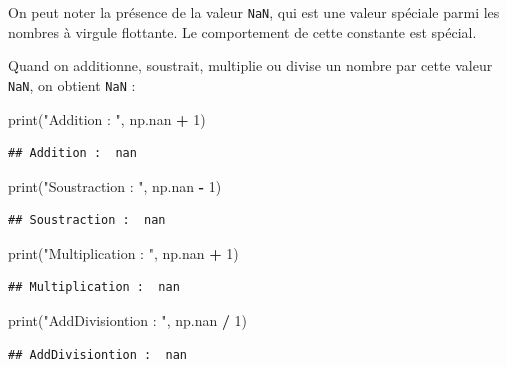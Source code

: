 \documentclass[12pt,]{book}
\newenvironment{Shaded}{\begin{snugshade}}{\end{snugshade}}
\newcommand{\DecValTok}[1]{\textcolor[rgb]{0.00,0.00,0.81}{#1}}
\newcommand{\StringTok}[1]{\textcolor[rgb]{0.31,0.60,0.02}{#1}}
\newcommand{\OperatorTok}[1]{\textcolor[rgb]{0.81,0.36,0.00}{\textbf{#1}}}
\newcommand{\BuiltInTok}[1]{#1}
\newcommand{\NormalTok}[1]{#1}
\numberwithin{equation}{section}
\numberwithin{countremarque}{section}
\begin{document}
On peut noter la présence de la valeur \texttt{NaN}, qui est une valeur
spéciale parmi les nombres à virgule flottante. Le comportement de cette
constante est spécial.

Quand on additionne, soustrait, multiplie ou divise un nombre par cette
valeur \texttt{NaN}, on obtient \texttt{NaN} :

\begin{Shaded}
\begin{Highlighting}[]
\BuiltInTok{print}\NormalTok{(}\StringTok{"Addition : "}\NormalTok{, np.nan }\OperatorTok{+} \DecValTok{1}\NormalTok{)}
\end{Highlighting}
\end{Shaded}

\begin{lstlisting}
## Addition :  nan
\end{lstlisting}

\begin{Shaded}
\begin{Highlighting}[]
\BuiltInTok{print}\NormalTok{(}\StringTok{"Soustraction : "}\NormalTok{, np.nan }\OperatorTok{-} \DecValTok{1}\NormalTok{)}
\end{Highlighting}
\end{Shaded}

\begin{lstlisting}
## Soustraction :  nan
\end{lstlisting}

\begin{Shaded}
\begin{Highlighting}[]
\BuiltInTok{print}\NormalTok{(}\StringTok{"Multiplication : "}\NormalTok{, np.nan }\OperatorTok{+} \DecValTok{1}\NormalTok{)}
\end{Highlighting}
\end{Shaded}

\begin{lstlisting}
## Multiplication :  nan
\end{lstlisting}

\begin{Shaded}
\begin{Highlighting}[]
\BuiltInTok{print}\NormalTok{(}\StringTok{"AddDivisiontion : "}\NormalTok{, np.nan }\OperatorTok{/} \DecValTok{1}\NormalTok{)}
\end{Highlighting}
\end{Shaded}

\begin{lstlisting}
## AddDivisiontion :  nan
\end{lstlisting}
\end{document}
